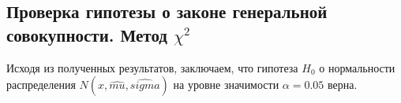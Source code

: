 \subsection{Проверка гипотезы о законе генеральной совокупности. Метод $\chi^2$}

Исходя из полученных результатов, заключаем, что гипотеза $H_0$ о нормальности распределения $N(x, \hat{mu}, \hat{sigma})$ на уровне значимости $\alpha = 0.05$ верна.